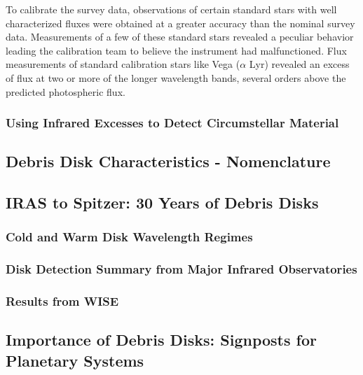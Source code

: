    To calibrate the survey data, observations of certain standard stars with well characterized fluxes were obtained at a greater accuracy than the nominal survey data. Measurements of a few of these standard stars revealed a peculiar behavior leading the calibration team to believe the instrument had malfunctioned. Flux measurements of standard calibration stars like Vega ($\alpha$ Lyr) revealed an excess of flux at two or more of the longer wavelength bands, several orders above the predicted photospheric flux\citep{Aumann1984}. 



                        
        \subsubsection{Using Infrared Excesses to Detect Circumstellar Material}\label{sec:excess_detection}
    \subsection{Debris Disk Characteristics - Nomenclature}        
        
    \subsection{IRAS to Spitzer: 30 Years of Debris Disks}\label{sec:30years}
    
        \subsubsection{Cold and Warm Disk Wavelength Regimes}

        \subsubsection{Disk Detection Summary from Major Infrared Observatories}\label{sec:IR_observatories}
        
        \subsubsection{Results from WISE}\label{sec:past_wise}
        
        
    \subsection{Importance of Debris Disks: Signposts for Planetary Systems}
        
